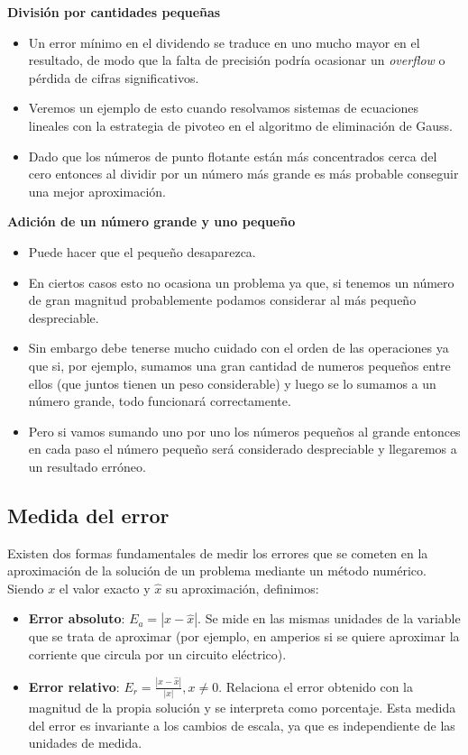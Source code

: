 \documentclass[openany]{book}
\providecommand{\tightlist}{%
  \setlength{\itemsep}{0pt}\setlength{\parskip}{0pt}}
\begin{document}
\textbf{División por cantidades pequeñas}

\begin{itemize}
\tightlist
\item
  Un error mínimo en el dividendo se traduce en uno mucho mayor en el resultado, de modo que la falta de precisión podría ocasionar un \emph{overflow} o pérdida de cifras significativos.
\item
  Veremos un ejemplo de esto cuando resolvamos sistemas de ecuaciones lineales con la estrategia de pivoteo en el algoritmo de eliminación de Gauss.
\item
  Dado que los números de punto flotante están más concentrados cerca del cero entonces al dividir por un número más grande es más probable conseguir una mejor aproximación.
\end{itemize}

\textbf{Adición de un número grande y uno pequeño}

\begin{itemize}
\tightlist
\item
  Puede hacer que el pequeño desaparezca.
\item
  En ciertos casos esto no ocasiona un problema ya que, si tenemos un número de gran magnitud probablemente podamos considerar al más pequeño despreciable.
\item
  Sin embargo debe tenerse mucho cuidado con el orden de las operaciones ya que si, por ejemplo, sumamos una gran cantidad de numeros pequeños entre ellos (que juntos tienen un peso considerable) y luego se lo sumamos a un número grande, todo funcionará correctamente.
\item
  Pero si vamos sumando uno por uno los números pequeños al grande entonces en cada paso el número pequeño será considerado despreciable y llegaremos a un resultado erróneo.
\end{itemize}

\hypertarget{medida-del-error}{%
\subsection{Medida del error}\label{medida-del-error}}

Existen dos formas fundamentales de medir los errores que se cometen en la aproximación de la solución de un problema mediante un método numérico. Siendo \(x\) el valor exacto y \(\hat{x}\) su aproximación, definimos:

\begin{itemize}
\item
  \textbf{Error absoluto}: \(E_a = |x - \hat{x}|\). Se mide en las mismas unidades de la variable que se trata de aproximar (por ejemplo, en amperios si se quiere aproximar la corriente que circula por un circuito eléctrico).
\item
  \textbf{Error relativo}: \(E_r = \frac{|x - \hat{x}|}{|x|}, x\neq 0\). Relaciona el error obtenido con la magnitud de la propia solución y se interpreta como porcentaje. Esta medida del error es invariante a los cambios de escala, ya que es independiente de las unidades de medida.
\end{itemize}
\end{document}
